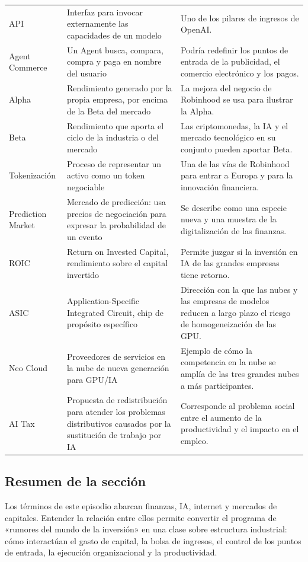 \begin{longtable}{p{}p{}p{}}
API & Interfaz para invocar externamente las capacidades de un modelo & Uno de los pilares de ingresos de OpenAI. \\
Agent Commerce & Un Agent busca, compara, compra y paga en nombre del usuario & Podría redefinir los puntos de entrada de la publicidad, el comercio electrónico y los pagos. \\
Alpha & Rendimiento generado por la propia empresa, por encima de la Beta del mercado & La mejora del negocio de Robinhood se usa para ilustrar la Alpha. \\
Beta & Rendimiento que aporta el ciclo de la industria o del mercado & Las criptomonedas, la IA y el mercado tecnológico en su conjunto pueden aportar Beta. \\
Tokenización & Proceso de representar un activo como un token negociable & Una de las vías de Robinhood para entrar a Europa y para la innovación financiera. \\
Prediction Market & Mercado de predicción: usa precios de negociación para expresar la probabilidad de un evento & Se describe como una especie nueva y una muestra de la digitalización de las finanzas. \\
ROIC & Return on Invested Capital, rendimiento sobre el capital invertido & Permite juzgar si la inversión en IA de las grandes empresas tiene retorno. \\
ASIC & Application-Specific Integrated Circuit, chip de propósito específico & Dirección con la que las nubes y las empresas de modelos reducen a largo plazo el riesgo de homogeneización de las GPU. \\
Neo Cloud & Proveedores de servicios en la nube de nueva generación para GPU/IA & Ejemplo de cómo la competencia en la nube se amplía de las tres grandes nubes a más participantes. \\
AI Tax & Propuesta de redistribución para atender los problemas distributivos causados por la sustitución de trabajo por IA & Corresponde al problema social entre el aumento de la productividad y el impacto en el empleo. \\
\bottomrule
\end{longtable}

\subsection{Resumen de la sección}

Los términos de este episodio abarcan finanzas, IA, internet y mercados de capitales. Entender la relación entre ellos permite convertir el programa de «rumores del mundo de la inversión» en una clase sobre estructura industrial: cómo interactúan el gasto de capital, la bolsa de ingresos, el control de los puntos de entrada, la ejecución organizacional y la productividad.
